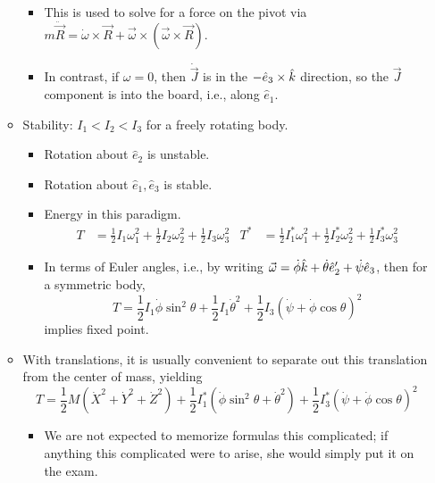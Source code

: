 \documentclass[../notes.tex]{subfiles}
\begin{document}
\begin{itemize}
\begin{itemize}
\begin{itemize}
            \item This is used to solve for a force on the pivot via $m\ddot{\vec{R}}=\dot{\omega}\times\vec{R}+\vec{\omega}\times(\vec{\omega}\times\vec{R})$.
            \item In contrast, if $\omega=0$, then $\dot{\vec{J}}$ is in the $-\hat{e}_3\times\hat{k}$ direction, so the $\vec{J}$ component is into the board, i.e., along $\hat{e}_1$.
        \end{itemize}
        \item Stability: $I_1<I_2<I_3$ for a freely rotating body.
        \begin{itemize}
            \item Rotation about $\hat{e}_2$ is unstable.
            \item Rotation about $\hat{e}_1,\hat{e}_3$ is stable.
            \item Energy in this paradigm.
            \begin{align*}
                T &= \frac{1}{2}I_1\omega_1^2+\frac{1}{2}I_2\omega_2^2+\frac{1}{2}I_3\omega_3^2&
                T^* &= \frac{1}{2}I_1^*\omega_1^2+\frac{1}{2}I_2^*\omega_2^2+\frac{1}{2}I_3^*\omega_3^2
            \end{align*}
            \item In terms of Euler angles, i.e., by writing $\vec{\omega}=\dot{\phi}\hat{k}+\dot{\theta}\hat{e}_2'+\dot{\psi}\hat{e}_3$, then for a symmetric body,
            \begin{equation*}
                T = \frac{1}{2}I_1\dot{\phi}\sin^2\theta+\frac{1}{2}I_1\dot{\theta}^2+\frac{1}{2}I_3(\dot{\psi}+\dot{\phi}\cos\theta)^2
            \end{equation*}
            implies fixed point.
        \end{itemize}
        \item With translations, it is usually convenient to separate out this translation from the center of mass, yielding
        \begin{equation*}
            T = \frac{1}{2}M(\dot{X}^2+\dot{Y}^2+\dot{Z}^2)+\frac{1}{2}I_1^*(\dot{\phi}\sin^2\theta+\dot{\theta}^2)+\frac{1}{2}I_3^*(\dot{\psi}+\dot{\phi}\cos\theta)^2
        \end{equation*}
        \begin{itemize}
            \item We are not expected to memorize formulas this complicated; if anything this complicated were to arise, she would simply put it on the exam.
        \end{itemize}

\end{itemize}
\end{itemize}
\end{document}
